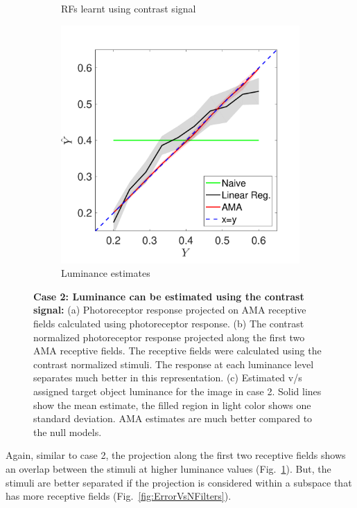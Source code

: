\documentclass{jov}
\begin{document}
\begin{figure}
\begin{subfigure}[b]{0.3 \textwidth}
        \caption{RFs learnt using contrast signal}
        \label{fig:constrastWorks}
    \end{subfigure}
            \begin{subfigure}[b]{0.3 \textwidth}
        \includegraphics[width=\textwidth]{../Figures/Figure11/Figure11_c.pdf}
        \caption{Luminance estimates}
        \label{fig:case10Results}
    \end{subfigure}
    \caption{{\bf Case 2: Luminance can be estimated using the contrast signal:} (a) Photoreceptor response projected on AMA receptive fields calculated using photoreceptor response. (b) The contrast normalized photoreceptor response projected along the first two AMA receptive fields. The receptive fields were calculated using the contrast normalized stimuli. The response at each luminance level separates much better in this representation. (c) Estimated v/s assigned target object luminance for the image in case 2. Solid lines show the mean estimate, the filled region in light color  shows one standard deviation. AMA estimates are much better compared to the null models.}
\label{fig:importanceOfConstrast}
\end{figure}

Again, similar to case 2, the projection along the first two receptive fields shows an overlap between the stimuli at higher luminance values (Fig.~\ref{fig:constrastWorks}). But, the stimuli are better separated if the projection is considered within a subspace that has more receptive fields (Fig.~\ref{fig:ErrorVsNFilters}).
\end{document}
